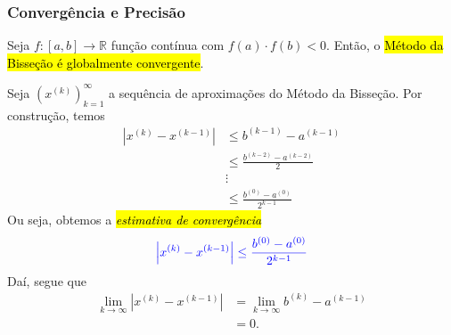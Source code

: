\subsubsection{Convergência e Precisão}

\begin{teo}\label{cap_eq1d_sec_bissec:teo:convp}
  Seja $f:[a, b]\to\mathbb{R}$ função contínua com $f(a)\cdot f(b) < 0$. Então, o \hl{Método da Bisseção é globalmente convergente}.
\end{teo}
\begin{dem}
  Seja $(x^{(k)})_{k=1}^\infty$ a sequência de aproximações do Método da Bisseção. Por construção, temos
  \begin{align}
    \left|x^{(k)} - x^{(k-1)}\right| &\leq b^{(k-1)}-a^{(k-1)}\\
                                     &\leq \frac{b^{(k-2)}-a^{(k-2)}}{2}\\
                                     &\vdots\\
                                     &\leq \frac{b^{(0)}-a^{(0)}}{2^{k-1}}
  \end{align}
  Ou seja, obtemos a \hl{\emph{estimativa de convergência}}
  \begin{equation}\label{cap_eq1d_sec_bissec:eq:estconvp}
    {\color{blue}\left|x^{(k)} - x^{(k-1)}\right| \leq \frac{b^{(0)}-a^{(0)}}{2^{k-1}}}
  \end{equation}
  Daí, segue que
  \begin{align}
    \lim_{k\to\infty} \left|x^{(k)}-x^{(k-1)}\right| &= \lim_{k\to\infty} b^{(k)}-a^{(k-1)}\\
                                                     &= 0.
  \end{align}
\end{dem}

